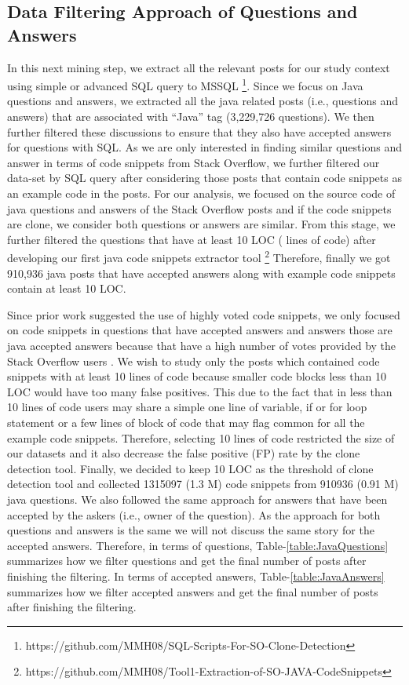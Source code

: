 \documentclass[conference]{IEEEtran}
\begin{document}
	
	\subsection{Data Filtering Approach of Questions and Answers}
	In this next mining step, we extract all the relevant posts for our study context using simple or advanced SQL query to MSSQL \footnote{https://github.com/MMH08/SQL-Scripts-For-SO-Clone-Detection}. Since we focus on Java questions and answers, we extracted all the java related posts (i.e., questions and answers) that are associated with “Java” tag (3,229,726 questions). We then further filtered these discussions to ensure that they also have accepted answers for questions with SQL. As we are only interested in finding similar questions and answer in terms of code snippets from Stack Overflow, we further filtered our data-set by SQL query after considering those posts that contain code snippets as  an example code in the posts. For our analysis, we focused on the source code of java questions and answers of the Stack Overflow posts and if the code snippets are clone, we consider both questions or answers are similar. From this stage, we further filtered the questions that have at least 10 LOC ( lines of code) after developing our first java code snippets extractor tool \footnote{https://github.com/MMH08/Tool1-Extraction-of-SO-JAVA-CodeSnippets} Therefore,  finally we got 910,936 java posts that have accepted answers along with example code snippets contain at least 10 LOC. 
	
	Since prior work suggested the use of highly voted code snippets, we only focused on code snippets in questions that have accepted answers and answers those are java accepted answers because that have a high number of votes provided by the Stack Overflow users \cite{b8}. We wish to study only the posts which contained code snippets with at least 10 lines of code because smaller code blocks less than 10 LOC would have too many false positives. This due to the fact that in less than 10 lines of code users may share a simple one line of variable, if or for loop statement or a few lines of block of code that may flag common for all the example code snippets. Therefore, selecting 10 lines of code restricted the size of our datasets and it also decrease the false positive (FP) rate by the clone detection tool. Finally, we decided to keep 10 LOC as the threshold of clone detection tool and collected 1315097 (1.3 M) code snippets from 910936 (0.91 M) java questions. We also followed the same approach for answers that have been accepted by the askers (i.e., owner of the question). As the approach for both questions and answers is the same we will not discuss the same story for the accepted answers. Therefore, in terms of questions, Table-\ref{table:JavaQuestions} summarizes how we filter questions and get the final number of posts after finishing the filtering. In terms of accepted answers, Table-\ref{table:JavaAnswers} summarizes how we filter accepted answers and get the final number of posts after finishing the filtering.
	
\end{document}
